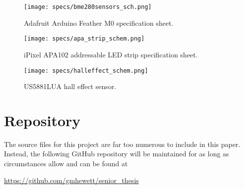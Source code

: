 \begin{figure}[h]
    \texttt{[image: specs/bme280sensors\_sch.png]}
    \caption{\label{bme280}Adafruit Arduino Feather M0 specification sheet.}
\end{figure}

\begin{figure}[h]
    \texttt{[image: specs/apa\_strip\_schem.png]}
    \caption{\label{apastrip}iPixel APA102 addressable LED strip specification sheet.}
\end{figure}

\begin{figure}[t]
\begin{center}
    \texttt{[image: specs/halleffect\_schem.png]}
    \caption{\label{halleffect} US5881LUA hall effect sensor.}
\end{center}
\end{figure}

\section{Repository}

The source files for this project are far too numerous to include in this paper. Instead, the following GitHub repository will be maintained for as long as circumstances allow and can be found at

\noindent\url{https://github.com/gmhewett/senior_thesis}



